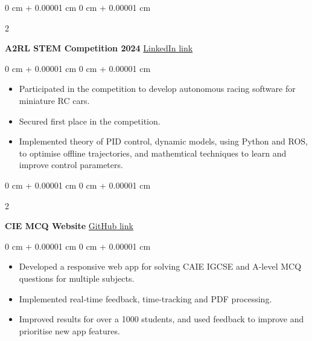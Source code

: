 \documentclass[10pt, letterpaper]{article}
\newenvironment{highlights}{
    \begin{itemize}[
        topsep=0.10 cm,
        parsep=0.10 cm,
        partopsep=0pt,
        itemsep=0pt,
        leftmargin=0 cm + 10pt
    ]
}{
    \end{itemize}
} %
\newenvironment{onecolentry}{
    \begin{adjustwidth}{
        0 cm + 0.00001 cm
    }{
        0 cm + 0.00001 cm
    }
}{
    \end{adjustwidth}
} %
\newenvironment{twocolentry}[2][]{
    \onecolentry
    \def\secondColumn{#2}
    \setcolumnwidth{\fill, 4.5 cm}
    \begin{paracol}{2}
}{
    \switchcolumn \raggedleft \secondColumn
    \end{paracol}
    \endonecolentry
} %
\begin{document}
        \vspace{0.2 cm}

        \begin{twocolentry}{
            \href{https://www.linkedin.com/posts/abban-fahim_extremely-happy-to-announce-my-team-at-heriot-watt-activity-7191019075861409793-ZwxJ?utm_source=social_share_sheet&utm_medium=member_desktop_web}{LinkedIn link}
        }
        \textbf{A2RL STEM Competition 2024}\end{twocolentry}
        
        \vspace{0.10 cm}
        \begin{onecolentry}
            \begin{highlights}
                \item Participated in the competition to develop autonomous racing software for miniature RC cars.
                \item Secured first place in the competition.
                \item Implemented theory of PID control, dynamic models, using Python and ROS, to optimise offline trajectories, and mathemtical techniques to learn and improve control parameters.
            \end{highlights}

        \end{onecolentry}

        \vspace{0.2 cm}

        \begin{twocolentry}{
            \href{https://github.com/Abban-Fahim/MCQ/}{GitHub link}
        }
            \textbf{CIE MCQ Website}\end{twocolentry}

        \vspace{0.10 cm}
        \begin{onecolentry}
            \begin{highlights}
                \item Developed a responsive web app for solving CAIE IGCSE and A-level MCQ questions for multiple subjects.
                \item Implemented real-time feedback, time-tracking and PDF processing.
                \item Improved results for over a 1000 students, and used feedback to improve and prioritise new app features.
            \end{highlights}
        \end{onecolentry} 
    
\end{document}

